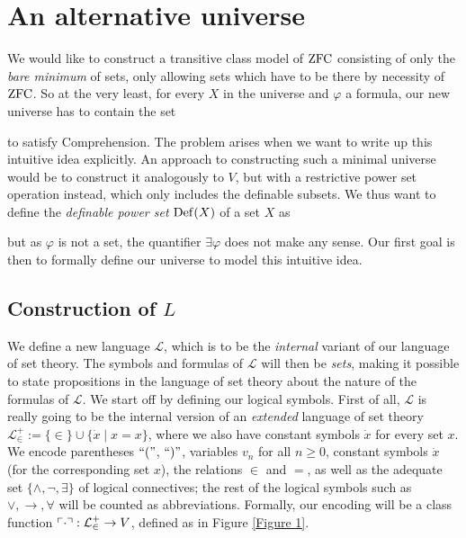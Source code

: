\chapter{An alternative universe}
\thispagestyle{fancy}

We would like to construct a transitive class model of $\operatorname{ZFC}$ consisting of only the \textit{bare minimum} of sets, only allowing sets which have to be there by necessity of $\operatorname{ZFC}$. So at the very least, for every $X$ in the universe and $\varphi$ a formula, our new universe has to contain the set

to satisfy Comprehension. The problem arises when we want to write up this intuitive idea explicitly. An approach to constructing such a minimal universe would be to construct it analogously to $V$, but with a restrictive power set operation instead, which only includes the definable subsets. We thus want to define the \textit{definable power set} $\operatorname{Def}(X)$ of a set $X$ as

but as $\varphi$ is not a set, the quantifier $\exists\varphi$ does not make any sense. Our first goal is then to formally define our universe to model this intuitive idea.

\section{Construction of $L$}
We define a new language $\mathscr L$, which is to be the \textit{internal} variant of our language of set theory. The symbols and formulas of $\mathscr L$ will then be \textit{sets}, making it possible to state propositions in the language of set theory about the nature of the formulas of $\mathscr L$. We start off by defining our logical symbols. First of all, $\mathscr L$ is really going to be the internal version of an \textit{extended} language of set theory $\mathcal{L}_\in^+:=\{\in\}\cup\{\dot x\mid x=x\}$, where we also have constant symbols $\dot x$ for every set $x$. We encode parentheses $``("$, $``)"$, variables $v_n$ for all $n\geq 0$, constant symbols $\dot x$ (for the corresponding set $x$), the relations $\in$ and $=$, as well as the adequate set $\{\land,\lnot,\exists\}$ of logical connectives; the rest of the logical symbols such as $\lor, \to, \forall$ will be counted as abbreviations. Formally, our encoding will be a class function $\ulcorner \cdot \urcorner:\mathcal{L}_\in^+\to V$, defined as in Figure \ref{Figure 1}.

